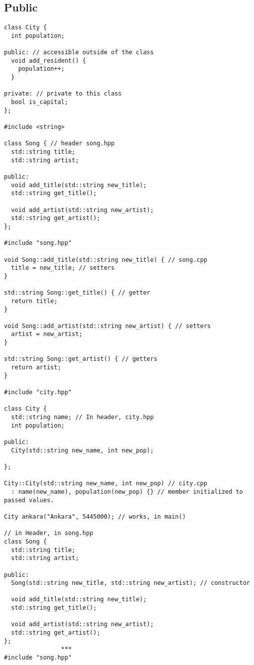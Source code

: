 \subsection{Public}

\begin{verbatim}
class City {
  int population; 
 
public: // accessible outside of the class
  void add_resident() { 
    population++;
  }

private: // private to this class
  bool is_capital;
};

#include <string>

class Song { // header song.hpp
  std::string title;
  std::string artist;

public:
  void add_title(std::string new_title);
  std::string get_title();
  
  void add_artist(std::string new_artist);
  std::string get_artist();
};

#include "song.hpp"

void Song::add_title(std::string new_title) { // song.cpp
  title = new_title; // setters
}

std::string Song::get_title() { // getter
  return title;
}

void Song::add_artist(std::string new_artist) { // setters
  artist = new_artist;
}

std::string Song::get_artist() { // getters
  return artist;
}

#include "city.hpp"
 
class City {
  std::string name; // In header, city.hpp
  int population;
 
public:
  City(std::string new_name, int new_pop);
 
};
 
City::City(std::string new_name, int new_pop) // city.cpp
  : name(new_name), population(new_pop) {} // member initialized to passed values.

City ankara("Ankara", 5445000); // works, in main()

// in Header, in song.hpp
class Song {
  std::string title;
  std::string artist;

public:
  Song(std::string new_title, std::string new_artist); // constructor

  void add_title(std::string new_title);
  std::string get_title();

  void add_artist(std::string new_artist);
  std::string get_artist();
};
                ***
#include "song.hpp"


\end{verbatim}
